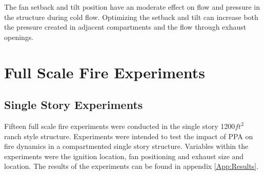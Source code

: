 \documentclass{article}
\begin{document}
The fan setback and tilt position have an moderate effect on flow and pressure in the structure during cold flow. Optimizing the setback and tilt can increase both the pressure created in adjacent compartments and the flow through exhaust openings. 

\section{Full Scale Fire Experiments}

\subsection{Single Story Experiments} \label{SingleStoryExp}

Fifteen full scale fire experiments were conducted in the single story 1200$ft^2$ ranch style structure. Experiments were intended to test the impact of PPA on fire dynamics in a compartmented single story structure. Variables within the experiments were the ignition location, fan positioning and exhaust size and location. The results of the experiments can be found in appendix \ref{App:Results}.

\mbox{}
\end{document}

